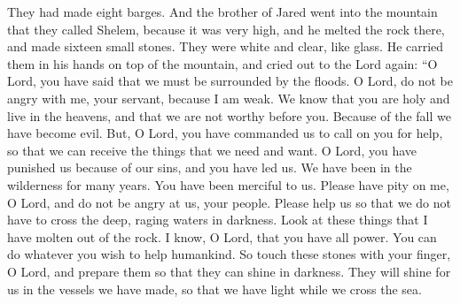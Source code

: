 They had made eight barges. And the brother of Jared went into the mountain that they called Shelem, because it was very high, and he melted the rock there, and made sixteen small stones. They were white and clear, like glass. He carried them in his hands on top of the mountain, and cried out to the Lord again:
\bverse \iffalse O Lord, thou hast said that we must be encompassed about by the floods. Now behold, O Lord, and do not be angry with thy servant because of his weakness before thee; for we know that thou art holy and dwellest in the heavens, and that we are unworthy before thee; because of the fall our natures have become evil continually; nevertheless, O Lord, thou hast given us a commandment that we must call upon thee, that from thee we may receive according to our desires. \fi
``O Lord, you have said that we must be surrounded by the floods. O Lord, do not be angry with me, your servant, because I am weak. We know that you are holy and live in the heavens, and that we are not worthy before you. Because of the fall we have become evil. But, O Lord, you have commanded us to call on you for help, so that we can receive the things that we need and want.
\bverse \iffalse Behold, O Lord, thou hast smitten us because of our iniquity, and hast driven us forth, and for these many years we have been in the wilderness; nevertheless, thou hast been merciful unto us.  O Lord, look upon me in pity, and turn away thine anger from this thy people, and suffer not that they shall go forth across this raging deep in darkness; but behold these things which I have molten out of the rock. \fi
O Lord, you have punished us because of our sins, and you have led us. We have been in the wilderness for many years. You have been merciful to us. Please have pity on me, O Lord, and do not be angry at us, your people. Please help us so that we do not have to cross the deep, raging waters in darkness. Look at these things that I have molten out of the rock.
\bverse \iffalse And I know, O Lord, that thou hast all power, and can do whatsoever thou wilt for the benefit of man; therefore touch these stones, O Lord, with thy finger, and prepare them that they may shine forth in darkness; and they shall shine forth unto us in the vessels which we have prepared, that we may have light while we shall cross the sea. \fi
I know, O Lord, that you have all power. You can do whatever you wish to help humankind. So touch these stones with your finger, O Lord, and prepare them so that they can shine in darkness. They will shine for us in the vessels we have made, so that we have light while we cross the sea.
